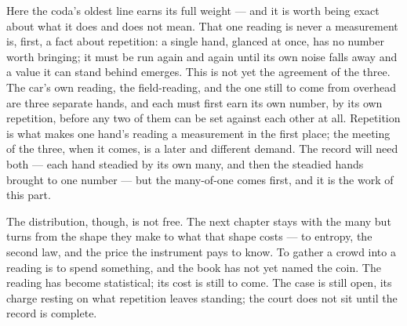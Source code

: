 Here the coda's oldest line earns its full weight --- and it is worth being exact about what it does and does
not mean. That one reading is never a measurement is, first, a fact about repetition: a single hand, glanced at
once, has no number worth bringing; it must be run again and again until its own noise falls away and a value it
can stand behind emerges. This is not yet the agreement of the three. The car's own reading, the field-reading,
and the one still to come from overhead are three separate hands, and each must first earn its own number, by
its own repetition, before any two of them can be set against each other at all. Repetition is what makes one
hand's reading a measurement in the first place; the meeting of the three, when it comes, is a later and
different demand. The record will need both --- each hand steadied by its own many, and then the steadied hands
brought to one number --- but the many-of-one comes first, and it is the work of this part.

The distribution, though, is not free. The next chapter stays with the many but turns from the shape they make
to what that shape costs --- to entropy, the second law, and the price the instrument pays to know. To gather a
crowd into a reading is to spend something, and the book has not yet named the coin. The reading has become
statistical; its cost is still to come. The case is still open, its charge resting on what repetition leaves
standing; the court does not sit until the record is complete.
